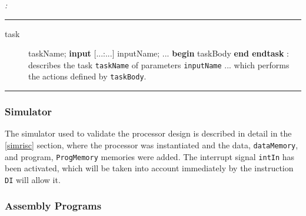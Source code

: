 \begin{verisum}{\em :

\hspace{-0.8cm} \rule[5mm]{16cm}{0.25mm} \vspace{-0.7cm}

\begin{description}
    \item[task] taskName; {\bf input} [...:...] inputName; ... {\bf begin} taskBody {\bf end  endtask} : describes the task {\tt taskName} of parameters {\tt inputName} ... which performs the actions defined by {\tt taskBody}.
\end{description}
\rule[5mm]{16cm}{0.25mm} }
\end{verisum}

\subsubsection{Simulator}

The simulator used to validate the processor design is described in detail in the \ref{simrisc} section, where the processor was instantiated and the data, {\tt dataMemory}, and program, {\tt ProgMemory} memories were added. The interrupt signal {\tt intIn} has been activated, which will be taken into account immediately by the instruction {\tt DI} will allow it.


\subsubsection{Assembly Programs}

